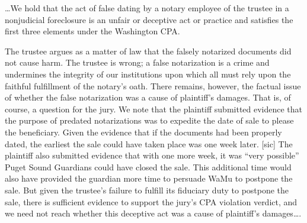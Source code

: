 \dots We hold that the act of false dating by a notary employee of the
trustee in a nonjudicial foreclosure is an unfair or deceptive act or practice
and satisfies the first three elements under the Washington CPA.

The trustee argues as a matter of law that the falsely notarized
documents did not cause harm. The trustee is wrong; a false notarization is a
crime and undermines the integrity of our institutions upon which all must rely
upon the faithful fulfillment of the notary's oath. There remains, however, the
factual issue of whether the false notarization was a cause of plaintiff's
damages. That is, of course, a question for the jury. We note that the
plaintiff submitted evidence that the purpose of predated notarizations was to
expedite the date of sale to please the beneficiary. Given the evidence that if
the documents had been properly dated, the earliest the sale could have taken
place was one week later. [sic] The plaintiff also submitted evidence that with
one more week, it was ``very possible'' Puget Sound Guardians could have closed
the sale. This additional time would also have provided the guardian more time
to persuade WaMu to postpone the sale. But given the trustee's failure to
fulfill its fiduciary duty to postpone the sale, there is sufficient evidence
to support the jury's CPA violation verdict, and we need not reach whether this
deceptive act was a cause of plaintiff's damages\dots.

